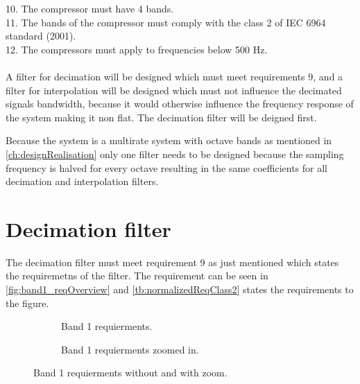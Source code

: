 10. The compressor must have 4 bands. \\
11. The bands of the compressor must comply with the class 2 of IEC 6964 standard (2001). \\
12. The compressors must apply to frequencies below 500 Hz. \\
\\ 
A filter for decimation will be designed which must meet requirements 9, and a filter for interpolation will be designed which must not influence the decimated signals bandwidth, because it would otherwise influence the frequency response of the system making it non flat. The decimation filter will be deigned first.

Because the system is a multirate system with octave bands as mentioned in \autoref{ch:designRealisation} only one filter needs to be designed because the sampling frequency is halved for every octave resulting in the same coefficients for all decimation and interpolation filters.

\section{Decimation filter}\label{sec:decFilter}
The decimation filter must meet requirement 9 as just mentioned which states the requiremetns of the filter. The requirement can be seen in \autoref{fig:band1_reqOverview} and \autoref{tb:normalizedReqClass2} states the requirements to the figure.

\begin{figure}[H]
\centering
\begin{subfigure}[t]{0.45\textwidth}
	
	\caption{Band 1 requierments.}
	\label{fig:band1_req}
\end{subfigure}
\begin{subfigure}[t]{0.45\textwidth}
	
	\caption{Band 1 requierments zoomed in.}
	\label{fig:band1_reqZoom}
\end{subfigure}
\caption{Band 1 requierments without and with zoom.}
\label{fig:band1_reqOverview}
\end{figure}


